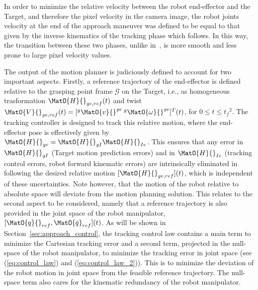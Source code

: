 In order to minimize the relative velocity between the robot end-effector and the Target, and therefore the pixel velocity in the camera image, the robot joints velocity at the end of the approach maneuver was defined to be equal to that given by the inverse kinematics of the tracking phase which follows. In this way, the transition between these two phases, unlike in~\cite{lampariello2013generating}, is more smooth and less prone to large pixel velocity values.

The output of the motion planner is judiciously defined to account for two important aspects. Firstly, a reference trajectory of the end-effector is defined relative to the grasping point frame $\mathcal{G}$ on the Target, i.e., as homogeneous trasformation $\MatO{H}{}_{ge, ref}(t)$ and twist $\MatO{V}{}_{ge, ref}(t)=[{}^{g}\MatO{v}{}^{ge} \: {}^{g}\MatO{\omega}{}^{ge}]{}^T(t)$, for $0 \le t \le t_f{}^2$. The tracking controller is designed to track this relative motion, where the end-effector pose is effectively given by $\MatO{H}{}_{ge}=\MatO{H}{}_{gI}\MatO{H}{}_{Ie}$. This ensures that any error in $\MatO{H}{}_{gI}$ (Target motion prediction errors) and in $\MatO{H}{}_{Ie}$ (tracking control errors, robot forward kinematic errors) are intrinsically eliminated in following the desired relative motion $[\MatO{H}{}_{ge, ref}](t)$, which is independent of these uncertainties. Note however, that the motion of the robot relative to absolute space will deviate from the motion planning solution. This relates to the second aspect to be considered, namely that a reference trajectory is also provided in the joint space of the robot manipulator, $[\MatO{q}{}_{ref}, \MatO{\dot{q}}_{ref}](t)$. As will be shown in Section~\ref{sec:approach_control}, the tracking control law contains a main term to minimize the Cartesian tracking error and a second term, projected in the null-space of the robot manipulator, to minimize the tracking error in joint space (see (\ref{eq:control_law}) and (\ref{eq:control_law_2})). This is to minimize the deviation of the robot motion in joint space from the feasible reference trajectory. The null-space term also cares for the kinematic redundancy of the robot manipulator. 

%

